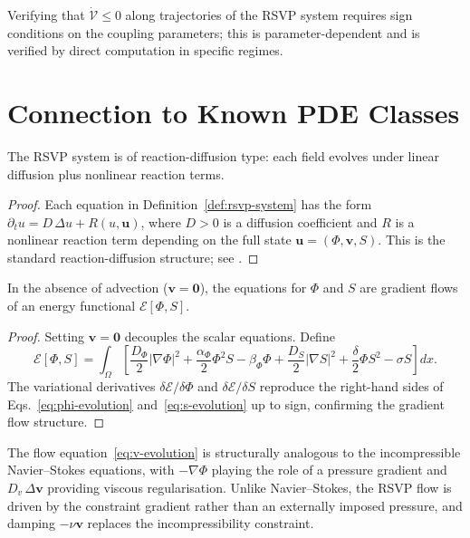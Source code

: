 \documentclass[11pt,openany]{book}
\begin{document}
Verifying that $\dot{\mathcal{V}} \le 0$ along trajectories
of the RSVP system requires sign conditions on the coupling
parameters; this is parameter-dependent and is verified by
direct computation in specific regimes.

\section{Connection to Known PDE Classes}
\label{sec:pde-connection}

\begin{proposition}
The RSVP system is of reaction-diffusion type: each field
evolves under linear diffusion plus nonlinear reaction
terms.
\end{proposition}

\begin{proof}
Each equation in Definition~\ref{def:rsvp-system} has the
form $\partial_t u = D\,\Delta u + R(u, \mathbf{u})$, where
$D > 0$ is a diffusion coefficient and $R$ is a nonlinear
reaction term depending on the full state $\mathbf{u} =
(\Phi, \boldsymbol{v}, S)$.  This is the standard
reaction-diffusion structure; see \citet{evans2010partial}.
\end{proof}

\begin{proposition}
In the absence of advection ($\boldsymbol{v} = \mathbf{0}$),
the equations for $\Phi$ and $S$ are gradient flows of an
energy functional $\mathcal{E}[\Phi, S]$.
\end{proposition}

\begin{proof}
Setting $\boldsymbol{v} = \mathbf{0}$ decouples the scalar
equations.  Define
\[
  \mathcal{E}[\Phi, S] = \int_\Omega \left[
    \frac{D_\Phi}{2}|\nabla\Phi|^2
    + \frac{\alpha_\Phi}{2}\Phi^2 S
    - \beta_\Phi \Phi
    + \frac{D_S}{2}|\nabla S|^2
    + \frac{\delta}{2}\Phi S^2
    - \sigma S
  \right] dx.
\]
The variational derivatives $\delta\mathcal{E}/\delta\Phi$
and $\delta\mathcal{E}/\delta S$ reproduce the right-hand
sides of Eqs.~\eqref{eq:phi-evolution}
and~\eqref{eq:s-evolution} up to sign, confirming the
gradient flow structure.
\end{proof}

\begin{remark}
The flow equation~\eqref{eq:v-evolution} is structurally
analogous to the incompressible Navier--Stokes equations,
with $-\nabla\Phi$ playing the role of a pressure gradient
and $D_v\,\Delta\boldsymbol{v}$ providing viscous
regularisation.  Unlike Navier--Stokes, the RSVP flow is
driven by the constraint gradient rather than an
externally imposed pressure, and damping $-\nu\boldsymbol{v}$
replaces the incompressibility constraint.
\end{remark}
\end{document}
